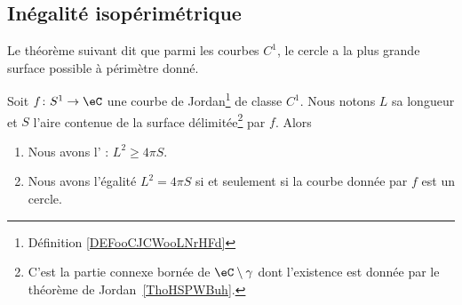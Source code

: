 \subsection{Inégalité isopérimétrique}

Le théorème suivant dit que parmi les courbes \( C^1\), le cercle a la plus grande surface possible à périmètre donné.
\begin{theorem}    \label{ThoIXyctPo}
    Soit \( f\colon S^1\to \eC \) une courbe de Jordan\footnote{Définition \ref{DEFooCJCWooLNrHFd}} de classe \( C^1\). Nous notons \( L\) sa longueur et \( S\) l'aire contenue de la surface délimitée\footnote{C'est la partie connexe bornée de \( \eC\setminus\gamma\) dont l'existence est donnée par le théorème de Jordan~\ref{ThoHSPWBuh}.} par \( f\). Alors
    \begin{enumerate}
        \item
            Nous avons l' : \( L^2\geq 4\pi S\).
        \item
            Nous avons l'égalité \( L^2=4\pi S\) si et seulement si la courbe donnée par \( f\) est un cercle.
    \end{enumerate}
\end{theorem}

